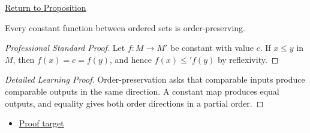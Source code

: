 \newpage
{}
\label{prf:constant-maps-monotone}

\begin{remark*}[Return]
\hyperref[prop:constant-maps-monotone]{Return to Proposition}
\end{remark*}

\begin{proposition*}
Every constant function between ordered sets is order-preserving.
\end{proposition*}

\begin{proof}[Professional Standard Proof]
\LRAProofBodyStart
Let $f:M\to M'$ be constant with value $c$. If $x\leq y$ in $M$, then
$f(x)=c=f(y)$, and hence $f(x)\leq' f(y)$ by reflexivity.
\end{proof}

\begin{proof}[Detailed Learning Proof]
\LRAProofBodyStart
Order-preservation asks that comparable inputs produce comparable outputs in
the same direction. A constant map produces equal outputs, and equality gives
both order directions in a partial order.
\end{proof}
\begin{remark*}
\end{remark*}



\begin{dependencies}
\begin{itemize}
  \item \hyperref[prop:constant-maps-monotone]{Proof target}
\end{itemize}
\end{dependencies}

\clearpage

